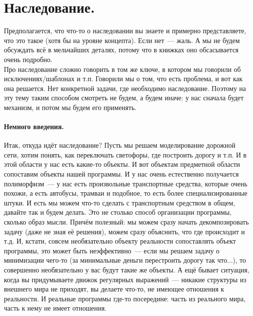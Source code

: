 \documentclass{article}
\begin{document}
    \section{Наследование.}
    Предполагается, что что-то о наследовании вы знаете и примерно представляете, что это такое (хотя бы на уровне концепта). Если нет~--- жаль. А мы не будем обсуждать всё в мельчайших деталях, потому что в книжках оно обсасывается очень подробно.\\
    Про наследование сложно говорить в том же ключе, в котором мы говорили об исключениях/шаблонах и т.п. Говорили мы о том, что есть проблема, и вот как она решается. Нет конкретной задачи, где необходимо наследование. Поэтому на эту тему таким способом смотреть не будем, а будем иначе: у нас сначала будет механизм, и потом мы будем его применять.
    \paragraph{Немного введения.}
    Итак, откуда идёт наследование? Пусть мы решаем моделирование дорожной сети, хотим понять, как переключать светофоры, где построить дорогу и т.п. И в этой области у нас есть какие-то объекты. И вот объектам предметной области сопоставим объекты нашей программы. И у нас очень естественно получается полиморфизм~--- у нас есть произвольные транспортные средства, которые очень похожи, а есть автобусы, трамваи и подобное, то есть более специализированные штуки. И есть мы можем что-то сделать с транспортным средством в общем, давайте так и будем делать. Это не столько способ организации программы, сколько образ мысли. Причём полезный: мы можем сразу начать декомпозировать задачу (даже не зная её решения), можем сразу объяснить, что где происходит и т.д. И, кстати, совсем необязательно объекту реальности сопоставлять объект программы, это может быть неэффективно~--- если мы решаем задачу о минимизации чего-то (за минимальные деньги перестроить дорогу так что...), то совершенно необязательно у вас будут такие же объекты. А ещё бывает ситуация, когда вы придумываете движок регулярных выражений~--- никакие структуры из внешнего мира не приходят, вы делаете что-то, не имеющее отношения к реальности. И реальные программы где-то посередине: часть из реального мира, часть к нему не имеет отношения.
\end{document}
